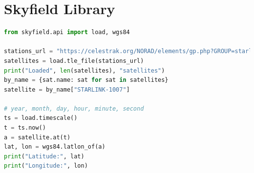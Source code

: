 \documentclass[IN,11pt,twoside,openright,idp,english]{tumthesis}
\begin{document}
\chapter{Skyfield Library}
\label{app:sky}
\begin{lstlisting}[language=python,caption={retrieving a Satellite's position using the Satname},captionpos=b]
from skyfield.api import load, wgs84

stations_url = "https://celestrak.org/NORAD/elements/gp.php?GROUP=starlink&FORMAT=tle"
satellites = load.tle_file(stations_url)
print("Loaded", len(satellites), "satellites")
by_name = {sat.name: sat for sat in satellites}
satellite = by_name["STARLINK-1007"]

# year, month, day, hour, minute, second
ts = load.timescale()
t = ts.now()
a = satellite.at(t)
lat, lon = wgs84.latlon_of(a)
print("Latitude:", lat)
print("Longitude:", lon)
\end{lstlisting}



\clearpage
\pagestyle{thesischapter}
\cleardoublepage
{}
\printbibliography[heading=bibintoc]
\clearpage
\pagestyle{empty}
\end{document}
